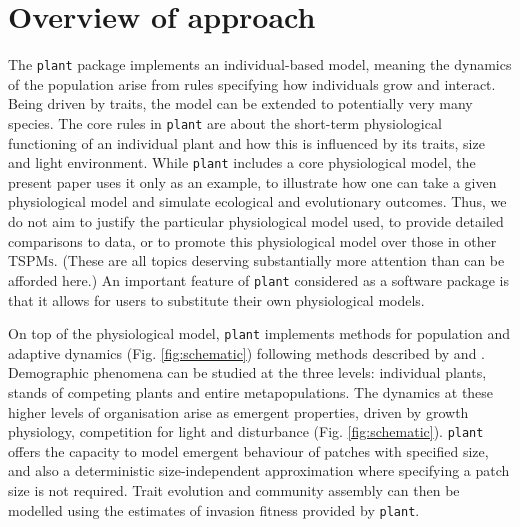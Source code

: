 \documentclass[a4paper,11pt]{article}
\newcommand{\plant}{\texttt{plant}}
\begin{document}
\section{Overview of approach}

The {\plant} package implements an individual-based model, meaning the dynamics of the
population arise from rules specifying how individuals grow and interact.
Being driven by traits, the model can be extended to potentially very many species. The
core rules in {\plant} are about the short-term physiological
functioning of an individual plant and how this is influenced by its
traits, size and light environment.  While {\plant} includes a core physiological model, the present paper uses it only as an example, to illustrate how one can take a given physiological model and simulate ecological and evolutionary outcomes. Thus, we do not aim to justify the particular physiological model used, to provide detailed
comparisons to data, or to promote this physiological model over those
in other \textsc{TSPMs}. (These are all topics deserving substantially
more attention than can be afforded here.)
An important feature of {\plant} considered as a software package is that it allows for users to substitute their own physiological models.

On top of the physiological model, {\plant} implements methods for
population and adaptive dynamics (Fig.  \ref{fig:schematic}) following methods
described by \citet{Falster-2011} and \citet{Falster-2015}. Demographic
phenomena can be studied at the three levels: individual plants, stands of
competing plants and entire metapopulations. The dynamics at these higher
levels of organisation arise as emergent properties, driven by growth
physiology, competition for light and disturbance (Fig.  \ref{fig:schematic}).
{\plant} offers the capacity to model emergent behaviour of patches with
specified size, and also a deterministic size-independent approximation
where specifying a patch size is not required. Trait evolution and community
assembly can then be modelled using the estimates of invasion fitness
provided by {\plant}.
\end{document}

